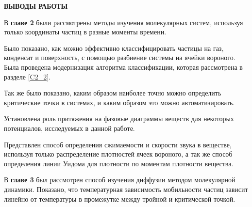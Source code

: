 \newpage
\begin{center}
\textbf{ВЫВОДЫ РАБОТЫ}
\end{center}



В \textbf{главе 2} были рассмотрены методы изучения молекулярных систем, используя только координаты частиц в разные моменты времени. 

Было показано, как можно эффективно классифицировать частицы на газ, конденсат и поверхность, с помощью разбиение системы на ячейки вороного. Была проведена модернизация алгоритма классификации, которая рассмотрена в разделе \ref{C2_2}.

Так же было показано, каким образом наиболее точно можно определить критические точки в системах, и каким образом это можно автоматизировать. 

Установлена роль притяжения на фазовые диаграммы веществ для некоторых потенциалов, исследуемых в данной работе.

Представлен способ определения сжимаемости и скорости звука в веществе, используя только распределение плотностей ячеек вороного, а так же способ определения линии Уидома для плотности по моментам плотности вещества.

В \textbf{главе 3} был рассмотрен способ изучения диффузии методом молекулярной динамики.
Показано, что температурная зависимость мобильности частиц зависит линейно от температуры в промежутке между тройной и критической точкой.

